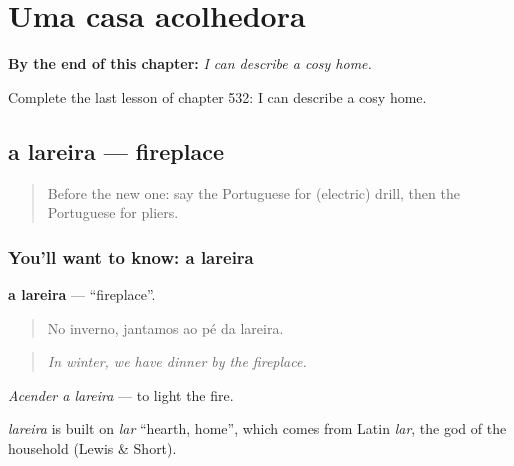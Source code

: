 
\chapter{Uma casa acolhedora}
\label{ch:pt-uma-casa-acolhedora}

\begin{chapteropening}
\textbf{By the end of this chapter:} \emph{I can describe a cosy home.}

Complete the last lesson of chapter 532: I can describe a cosy home.
\end{chapteropening}

\section[a lareira]{a lareira — fireplace}

\label{lesson:PT-C532-lareira}



\begin{quote}
Before the new one: say the Portuguese for (electric) drill, then the Portuguese for pliers.
\end{quote}

\subsection*{You'll want to know: a lareira}
\textbf{a lareira} — \textquotedblleft{}fireplace\textquotedblright{}.

\begin{quote}
No inverno, jantamos ao pé da lareira.
\end{quote}

\begin{quote}
\emph{In winter, we have dinner by the fireplace.}
\end{quote}

\emph{Acender a lareira} — to light the fire.

\begin{cousinweb}
\emph{lareira} is built on \emph{lar} \textquotedblleft{}hearth, home\textquotedblright{}, which comes from Latin \emph{lar}, the god of the household (Lewis \& Short).
\end{cousinweb}

